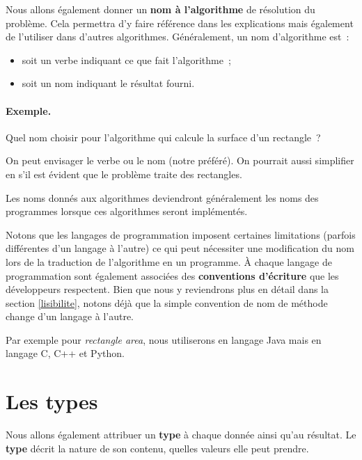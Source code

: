 		Nous allons également donner un \textbf{nom à l’algorithme}
		de résolution du problème.
		Cela permettra d’y faire référence dans les explications
		mais également de l’utiliser dans d’autres algorithmes.
		Généralement, un nom d’algorithme est~:
		\begin{itemize}
		\item soit un verbe indiquant ce que fait l’algorithme~;
		\item soit un nom indiquant le résultat fourni.	
		\end{itemize}
	
		\clearpage
		\begin{Emphase}
			\paragraph{Exemple.}	
			Quel nom choisir pour l’algorithme 
			qui calcule la surface d’un rectangle~?
	
			On peut envisager 
			le verbe 
			ou le nom  (notre préféré).
			On pourrait aussi simplifier en 
			s’il est évident que le problème traite des rectangles.
		\end{Emphase}
	
		Les noms donnés aux algorithmes deviendront généralement les noms des
		programmes lorsque ces algorithmes seront implémentés. 

		Notons que les langages de programmation imposent certaines limitations
		(parfois différentes d’un langage à l’autre) ce qui peut nécessiter une
		modification du nom lors de la traduction de l’algorithme en un
		programme. À chaque langage de programmation sont également associées
		des \textbf{conventions d'écriture} que les développeurs respectent.
		Bien que nous y reviendrons plus en détail dans la section
		\ref{lisibilite}, notons déjà que la simple convention de nom de méthode
		change d'un langage à l'autre. 
		
		Par exemple pour \textit{rectangle area}, nous utiliserons
		 en langage Java mais  en langage
		C, C++ et Python. 

	\section{Les types}
		
		Nous allons également attribuer un \textbf{type} à chaque donnée ainsi
		qu’au résultat.  Le \textbf{type} décrit la nature de son contenu,
		quelles valeurs elle peut prendre.
		
